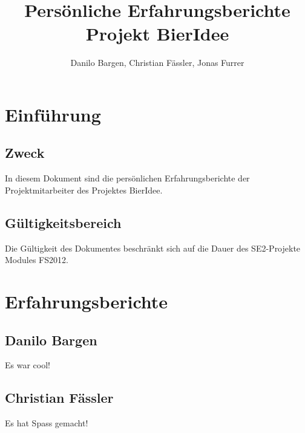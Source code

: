 \documentclass[10pt,a4paper]{scrartcl}
\author{Danilo Bargen, Christian Fässler, Jonas Furrer}
\title{Persönliche Erfahrungsberichte\\ Projekt BierIdee}
\begin{document}
\begin{titlepage}
	\maketitle
	\vspace{120mm}
	\thispagestyle{empty} %
\end{titlepage}

\tableofcontents
\newpage

\section{Einführung}

\subsection{Zweck}
In diesem Dokument sind die persönlichen Erfahrungsberichte der Projektmitarbeiter des Projektes BierIdee.

\subsection{Gültigkeitsbereich}
Die Gültigkeit des Dokumentes beschränkt sich auf die Dauer des SE2-Projekte Modules FS2012.

\newpage
\section{Erfahrungsberichte}
\subsection{Danilo Bargen}
Es war cool!


\newpage
\subsection{Christian Fässler}
Es hat Spass gemacht!


\newpage
\end{document}
